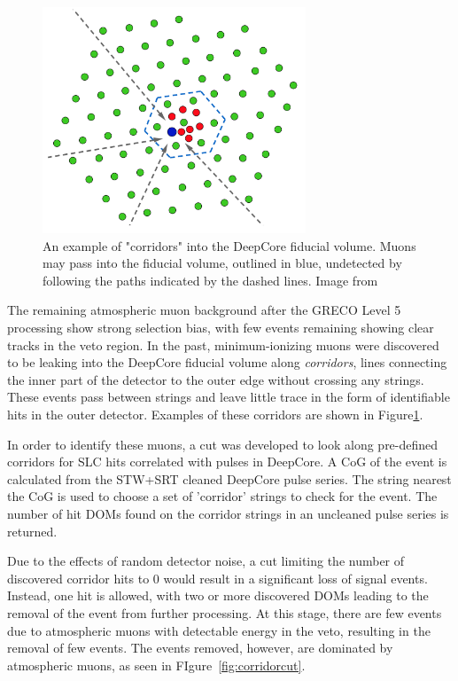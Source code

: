 \begin{figure}
\centering
\includegraphics[width=0.7\textwidth]{corridorcut_diagram.png} 
\caption[Example of Corridors into DeepCore]{An example of "corridors" into the DeepCore fiducial volume. Muons may pass into the fiducial volume, outlined in blue, undetected by following the paths indicated by the dashed lines. Image from \cite{Thesis-Dunkman}}
\label{fig:corridorcut_diagram}
\end{figure}

The remaining atmospheric muon background after the GRECO Level 5 processing show strong selection bias, with few events remaining showing clear tracks in the veto region.
In the past, minimum-ionizing muons were discovered to be leaking into the DeepCore fiducial volume along \emph{corridors}, lines connecting the inner part of the detector to the outer edge without crossing any strings.
These events pass between strings and leave little trace in the form of identifiable hits in the outer detector.
Examples of these corridors are shown in Figure\ref{fig:corridorcut_diagram}.

In order to identify these muons, a cut was developed to look along pre-defined corridors for SLC hits correlated with pulses in DeepCore.
A CoG of the event is calculated from the STW+SRT cleaned DeepCore pulse series.
The string nearest the CoG is used to choose a set of 'corridor' strings to check for the event.
The number of hit DOMs found on the corridor strings in an uncleaned pulse series is returned.

Due to the effects of random detector noise, a cut limiting the number of discovered corridor hits to 0 would result in a significant loss of signal events.
Instead, one hit is allowed, with two or more discovered DOMs leading to the removal of the event from further processing.
At this stage, there are few events due to atmospheric muons with detectable energy in the veto, resulting in the removal of few events.
The events removed, however, are dominated by atmospheric muons, as seen in FIgure~\ref{fig:corridorcut}.

